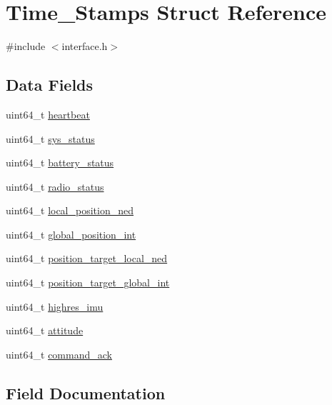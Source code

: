 \hypertarget{struct_time___stamps}{}\section{Time\+\_\+\+Stamps Struct Reference}
\label{struct_time___stamps}


{\ttfamily \#include $<$interface.\+h$>$}

\subsection*{Data Fields}
\begin{DoxyCompactItemize}
\item 
uint64\+\_\+t \hyperlink{struct_time___stamps_a0585817e699b46e384f5ccc2d122362a}{heartbeat}
\item 
uint64\+\_\+t \hyperlink{struct_time___stamps_a0c435af1e679e794a97d29f6ad8033c4}{sys\+\_\+status}
\item 
uint64\+\_\+t \hyperlink{struct_time___stamps_af6f0cc3b4549bdc74d9f5c3b01522877}{battery\+\_\+status}
\item 
uint64\+\_\+t \hyperlink{struct_time___stamps_a349d4b854b6448bec3938af7bb59a482}{radio\+\_\+status}
\item 
uint64\+\_\+t \hyperlink{struct_time___stamps_a39f9bcf43ad658301417a7aa3ae368bd}{local\+\_\+position\+\_\+ned}
\item 
uint64\+\_\+t \hyperlink{struct_time___stamps_a9bde3d252fe8abb20df512cfb8ed1879}{global\+\_\+position\+\_\+int}
\item 
uint64\+\_\+t \hyperlink{struct_time___stamps_a90cff6c62a9d017149d202852e3c7881}{position\+\_\+target\+\_\+local\+\_\+ned}
\item 
uint64\+\_\+t \hyperlink{struct_time___stamps_a6c9893fba620cfe3b8d8ff5ffd6a375b}{position\+\_\+target\+\_\+global\+\_\+int}
\item 
uint64\+\_\+t \hyperlink{struct_time___stamps_a05ee98180378af9ae38747893f5a4561}{highres\+\_\+imu}
\item 
uint64\+\_\+t \hyperlink{struct_time___stamps_ae5c3610ce264d2ccf7f529ae494ca474}{attitude}
\item 
uint64\+\_\+t \hyperlink{struct_time___stamps_aa52d5737fe1f692528b7ff03154399ea}{command\+\_\+ack}
\end{DoxyCompactItemize}


\subsection{Field Documentation}
